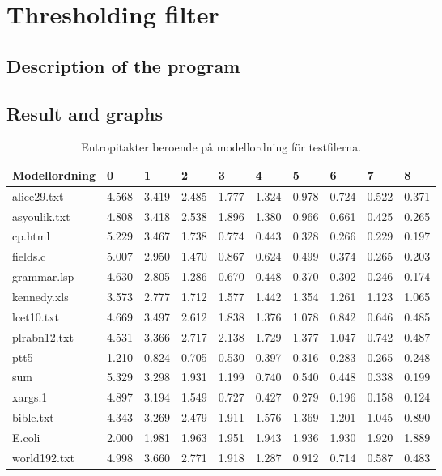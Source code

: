 \documentclass[a4paper,11pt]{article}
\begin{document}
\section{Thresholding filter}
\subsection{Description of the program}
\subsection{Result and graphs}

\begin{table}[h!]
  \label{entropitakt}
  \caption{Entropitakter beroende på modellordning för testfilerna.}
  \begin{tabular}[h]{|l|l|l|l|l|l|l|l|l|l|}
    \hline
    Modellordning & 0     & 1     & 2     & 3     & 4     & 5     & 6     & 7     & 8\\
    \hline
    alice29.txt   & 4.568 & 3.419 & 2.485 & 1.777 & 1.324 & 0.978 & 0.724 & 0.522 & 0.371 \\ 
    asyoulik.txt  & 4.808 & 3.418 & 2.538 & 1.896 & 1.380 & 0.966 & 0.661 & 0.425 & 0.265 \\ 
    cp.html       & 5.229 & 3.467 & 1.738 & 0.774 & 0.443 & 0.328 & 0.266 & 0.229 & 0.197 \\ 
    fields.c      & 5.007 & 2.950 & 1.470 & 0.867 & 0.624 & 0.499 & 0.374 & 0.265 & 0.203 \\ 
    grammar.lsp   & 4.630 & 2.805 & 1.286 & 0.670 & 0.448 & 0.370 & 0.302 & 0.246 & 0.174 \\ 
    kennedy.xls   & 3.573 & 2.777 & 1.712 & 1.577 & 1.442 & 1.354 & 1.261 & 1.123 & 1.065 \\ 
    lcet10.txt    & 4.669 & 3.497 & 2.612 & 1.838 & 1.376 & 1.078 & 0.842 & 0.646 & 0.485 \\ 
    plrabn12.txt  & 4.531 & 3.366 & 2.717 & 2.138 & 1.729 & 1.377 & 1.047 & 0.742 & 0.487 \\ 
    ptt5          & 1.210 & 0.824 & 0.705 & 0.530 & 0.397 & 0.316 & 0.283 & 0.265 & 0.248 \\ 
    sum           & 5.329 & 3.298 & 1.931 & 1.199 & 0.740 & 0.540 & 0.448 & 0.338 & 0.199 \\ 
    xargs.1       & 4.897 & 3.194 & 1.549 & 0.727 & 0.427 & 0.279 & 0.196 & 0.158 & 0.124 \\ 
    bible.txt     & 4.343 & 3.269 & 2.479 & 1.911 & 1.576 & 1.369 & 1.201 & 1.045 & 0.890 \\ 
    E.coli        & 2.000 & 1.981 & 1.963 & 1.951 & 1.943 & 1.936 & 1.930 & 1.920 & 1.889 \\ 
    world192.txt  & 4.998 & 3.660 & 2.771 & 1.918 & 1.287 & 0.912 & 0.714 & 0.587 & 0.483 \\ 
    \hline
  \end{tabular}
\end{table}
\end{document}
